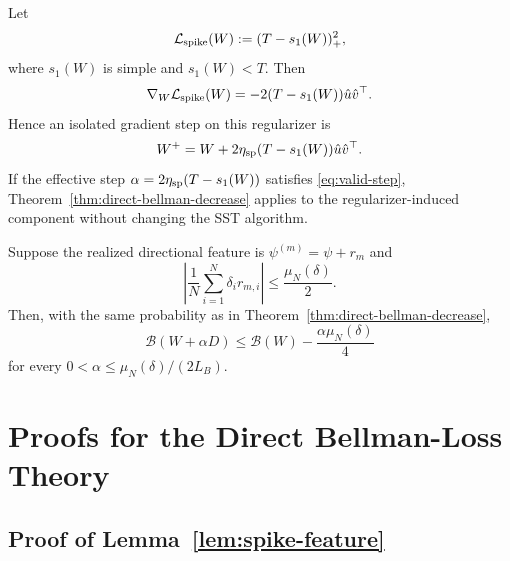 \begin{proposition}
\label{prop:hinge-direction}
Let
\begin{equation}
    \mathcal L_{\rm spike}(W):=(T-s_1(W))_+^2,
\end{equation}
where $s_1(W)$ is simple and $s_1(W)<T$.  Then
\begin{equation}
    \nabla_W\mathcal L_{\rm spike}(W)
    =-2(T-s_1(W))\hat u\hat v^\top.
\end{equation}
Hence an isolated gradient step on this regularizer is
\begin{equation}
    W^+=W+2\eta_{\rm sp}(T-s_1(W))\hat u\hat v^\top.
    \label{eq:regularizer-step}
\end{equation}
If the effective step
$\alpha=2\eta_{\rm sp}(T-s_1(W))$ satisfies
\eqref{eq:valid-step}, Theorem~\ref{thm:direct-bellman-decrease} applies to the
regularizer-induced component without changing the SST algorithm.
\end{proposition}

\begin{corollary}
\label{cor:finite-width}
Suppose the realized directional feature is
$\psi^{(m)}=\psi+r_m$ and
\begin{equation}
    \left|\frac1N\sum_{i=1}^N\delta_i r_{m,i}\right|
    \le\frac{\mu_N(\delta)}{2}.
    \label{eq:finite-width-condition}
\end{equation}
Then, with the same probability as in
Theorem~\ref{thm:direct-bellman-decrease},
\begin{equation}
    \mathcal B(W+\alpha D)
    \le \mathcal B(W)-\frac{\alpha\mu_N(\delta)}{4}
\end{equation}
for every $0<\alpha\le\mu_N(\delta)/(2L_B)$.
\end{corollary}

\appendix
\section{Proofs for the Direct Bellman-Loss Theory}
\label{app:direct-proofs}

\subsection{Proof of Lemma~\ref{lem:spike-feature}}

